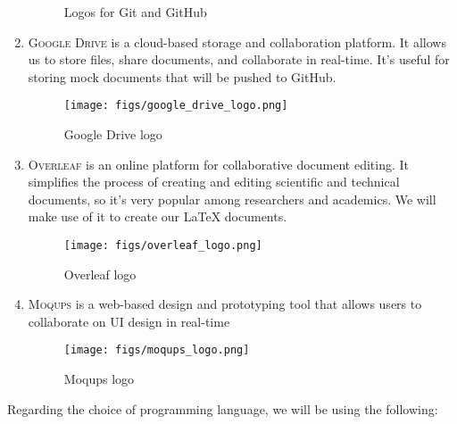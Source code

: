 \documentclass[conference]{IEEEtran}
\begin{document}
\begin{enumerate}
\begin{figure}[H]
        \caption{Logos for Git and GitHub}
        \label{fig:Logos}
        \end{figure} 
    \item \textsc{Google Drive} is a cloud-based storage and collaboration platform. It allows us to store files, share documents, and collaborate in real-time. It's useful for storing mock documents that will be pushed to GitHub.
        \begin{figure}[H]
        \centering
        \texttt{[image: figs/google\_drive\_logo.png]}
        \caption{Google Drive logo}
        \label{fig:Google Drive logo}
        \end{figure}
    \item \textsc{Overleaf} is an online platform for collaborative document editing. It simplifies the process of creating and editing scientific and technical documents, so it’s very popular among researchers and academics. We will make use of it to create our LaTeX documents.  
        \begin{figure}[H]
        \centering
        \texttt{[image: figs/overleaf\_logo.png]}
        \caption{Overleaf logo}
        \label{fig:overleaf logo}
        \end{figure}
    \item \textsc{Moqups} is a web-based design and prototyping tool that allows users to collaborate on UI design in real-time
        \begin{figure}[H]
        \centering
        \texttt{[image: figs/moqups\_logo.png]}
        \caption{Moqups logo}
        \label{fig:Moqups logo}
        \end{figure}
\end{enumerate}
Regarding the choice of programming language, we will be using the following:
\end{document}

